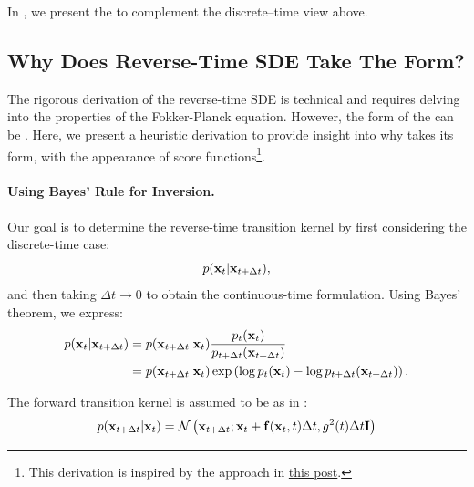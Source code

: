 In , we present the  to complement the discrete--time view above.




\subsection{Why Does Reverse-Time SDE Take The Form?}\label{subsec:reverse-sde-reason}

The rigorous derivation of the reverse-time SDE is technical and requires delving into the properties of the Fokker-Planck equation. However, the form of the  can be . Here, we present a heuristic derivation to provide insight into why  takes its form, with the appearance of score functions\footnote{This derivation is inspired by the approach in \href{https://alexxthiery.github.io/notes/reverse_and_tweedie/reverse_and_tweedie.html}{this post}.}. 


\paragraph{Using Bayes' Rule for Inversion.} 
Our goal is to determine the reverse-time transition kernel by first considering the discrete-time case:
\[
p({\mathbf{x}}_t | {\mathbf{x}}_{t+\Delta t}),
\]
and then taking $\Delta t \rightarrow 0$ to obtain the continuous-time formulation.
Using Bayes' theorem, we express:
\begin{align}\label{eq:reverse-sde-bayes-discrete}
    p({\mathbf{x}}_t | {\mathbf{x}}_{t+\Delta t}) 
    &= p({\mathbf{x}}_{t+\Delta t} | {\mathbf{x}}_t) \frac{p_t({\mathbf{x}}_t)}{p_{t+\Delta t}({\mathbf{x}}_{t+\Delta t})} \nonumber \\
    &= p({\mathbf{x}}_{t+\Delta t} | {\mathbf{x}}_t) \exp\left(\log p_t({\mathbf{x}}_t) - \log p_{t+\Delta t}({\mathbf{x}}_{t+\Delta t})\right).
\end{align}

The forward transition kernel is assumed to be as in :
\begin{equation*}
p({\mathbf{x}}_{t+\Delta t} | {\mathbf{x}}_t) = \mathcal{N}\left({\mathbf{x}}_{t+\Delta t}; {\mathbf{x}}_t + {\mathbf{f}}({\mathbf{x}}_t, t)\Delta t, g^2(t)\Delta t \mathbf{I}\right)
\end{equation*}

